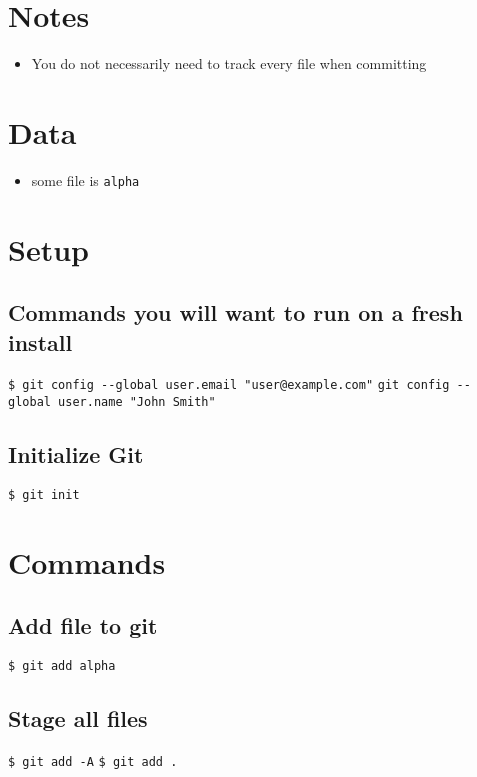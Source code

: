 \documentclass{article}
\title{\vspace{-2.25cm}{\small Git}\vspace{-1.5cm}}
\date{}
\begin{document}
\maketitle
\begin{multicols}{3}
	
\section{Notes}
\begin{itemize}
\item You do not necessarily need to track every file when committing

\end{itemize}

\section{Data}
\begin{itemize}
\item some file is \texttt{alpha}
\end{itemize}

\section{Setup}
\subsection{Commands you will want to run on a fresh install}
\lstinline|$ git config --global user.email "user@example.com"|
\lstinline|git config --global user.name "John Smith"|

\subsection{Initialize Git}
\lstinline|$ git init|
\section{Commands}

\subsection{Add file to git}
\lstinline|$ git add alpha|

\subsection{Stage all files}
\lstinline|$ git add -A|
\lstinline|$ git add .|


\end{multicols}
\end{document}
